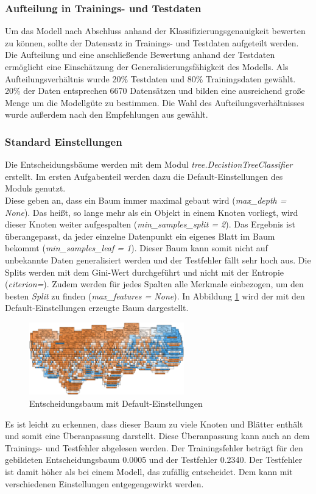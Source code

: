 \subsubsection{Aufteilung in Trainings- und Testdaten}
Um das Modell nach Abschluss anhand der Klassifizierungsgenauigkeit bewerten zu können, sollte der Datensatz in Trainings- und Testdaten aufgeteilt werden. Die Aufteilung und eine anschließende Bewertung anhand der Testdaten ermöglicht eine Einschätzung der Generalisierungsfähigkeit des Modells. Als Aufteilungsverhältnis wurde 20\% Testdaten und 80\% Trainingsdaten gewählt. 20\% der Daten entsprechen 6670 Datensätzen und bilden eine ausreichend große Menge um die Modellgüte zu bestimmen. Die Wahl des Aufteilungsverhältnisses wurde außerdem nach den Empfehlungen aus \cite{geron2017hands-on} gewählt.

\subsubsection{Standard Einstellungen}
Die Entscheidungsbäume werden mit dem Modul \emph{tree.DecistionTreeClassifier} erstellt. Im ersten Aufgabenteil werden dazu die Default-Einstellungen des Moduls genutzt.\\
\noindent \hspace*{7mm}
Diese geben an, dass ein Baum immer maximal gebaut wird (\emph{max\_depth = None}). Das heißt, so lange mehr als ein Objekt in einem Knoten vorliegt, wird dieser Knoten weiter aufgespalten (\emph{min\_samples\_split = 2}). Das Ergebnis ist überangepasst, da jeder einzelne Datenpunkt ein eigenes Blatt im Baum bekommt (\emph{min\_samples\_leaf = 1}). Dieser Baum kann somit nicht auf unbekannte Daten generalisiert werden und der Testfehler fällt sehr hoch aus. Die Splits werden mit dem Gini-Wert durchgeführt und nicht mit der Entropie (\emph{citerion=}). Zudem werden für jedes Spalten alle Merkmale einbezogen, um den besten \emph{Split} zu finden (\emph{max\_features = None}). In Abbildung \ref{fig:treedefault} wird der mit den Default-Einstellungen erzeugte Baum dargestellt.
\begin{figure}[h]
	\centering
	\includegraphics[width = 0.6\textwidth]{Bilder/treedefault}
	\caption{Entscheidungsbaum mit Default-Einstellungen}
	\label{fig:treedefault}
\end{figure}
Es ist leicht zu erkennen, dass dieser Baum zu viele Knoten und Blätter enthält und somit eine Überanpassung darstellt. Diese Überanpassung kann auch an dem Trainings- und Testfehler abgelesen werden. Der Trainingsfehler beträgt für den gebildeten Entscheidungsbaum 0.0005 und der Testfehler 0.2340. Der Testfehler ist damit höher als bei einem Modell, das zufällig entscheidet. Dem kann mit verschiedenen Einstellungen entgegengewirkt werden.
